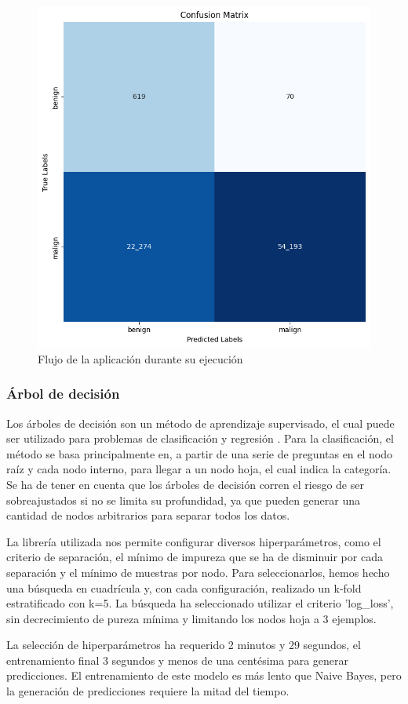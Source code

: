 \begin{figure}[H]
    \begin{center}
        \includegraphics[width=0.52\linewidth]{media/packet_pincer_train_models_Naive bayes.png}
    \end{center}
    \caption{Flujo de la aplicación durante su ejecución}\label{fig:naivebayesmatrix}
  \end{figure}

\subsubsection{Árbol de decisión}

Los árboles de decisión son un método de aprendizaje supervisado, el cual puede ser utilizado para problemas de clasificación y regresión \cite{ibmdecisiontrees}. Para la clasificación, el método se basa principalmente en, a partir de una serie de preguntas en el nodo raíz y cada nodo interno, para llegar a un nodo hoja, el cual indica la categoría. Se ha de tener en cuenta que los árboles de decisión corren el riesgo de ser sobreajustados si no se limita su profundidad, ya que pueden generar una cantidad de nodos arbitrarios para separar todos los datos.

La librería utilizada nos permite configurar diversos hiperparámetros, como el criterio de separación, el mínimo de impureza que se ha de disminuir por cada separación y el mínimo de muestras por nodo. Para seleccionarlos, hemos hecho una búsqueda en cuadrícula y, con cada configuración, realizado un k-fold estratificado con k=5. La búsqueda ha seleccionado utilizar el criterio 'log\_loss', sin decrecimiento de pureza mínima y limitando los nodos hoja a 3 ejemplos.

La selección de hiperparámetros ha requerido 2 minutos y 29 segundos, el entrenamiento final 3 segundos y menos de una centésima para generar predicciones. El entrenamiento de este modelo es más lento que Naive Bayes, pero la generación de predicciones requiere la mitad del tiempo.

